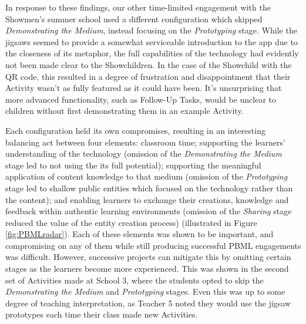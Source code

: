 In response to these findings, our other time-limited engagement with the Showmen's summer school used a different configuration which skipped \textit{Demonstrating the Medium}, instead focusing on the \textit{Prototyping} stage. While the jigsaws seemed to provide a somewhat serviceable introduction to the app due to the closeness of its metaphor, the full capabilities of the technology had evidently not been made clear to the Showchildren. In the case of the Showchild with the QR code, this resulted in a degree of frustration and disappointment that their Activity wasn't as fully featured as it could have been. It's unsurprising that more advanced functionality, such as Follow-Up Tasks, would be unclear to children without first demonstrating them in an example Activity.

Each configuration held its own compromises, resulting in an interesting balancing act between four elements: classroom time; supporting the learners' understanding of the technology (omission of the \textit{Demonstrating the Medium} stage led to not using the its full potential); supporting the meaningful application of content knowledge to that medium (omission of the \textit{Prototyping} stage led to shallow public entities which focused on the technology rather than the content); and enabling learners to exchange their creations, knowledge and feedback within authentic learning environments (omission of the \textit{Sharing} stage reduced the value of the entity creation process) (illustrated in Figure \ref{fig:PBMLradar}). Each of these elements was shown to be important, and compromising on any of them while still producing successful PBML engagements was difficult. However, successive projects can mitigate this by omitting certain stages as the learners become more experienced. This was shown in the second set of Activities made at School 3, where the students opted to skip the \textit{Demonstrating the Medium} and \textit{Prototyping} stages. Even this was up to some degree of teaching interpretation, as Teacher 5 noted they would use the jigsaw prototypes each time their class made new Activities. 

